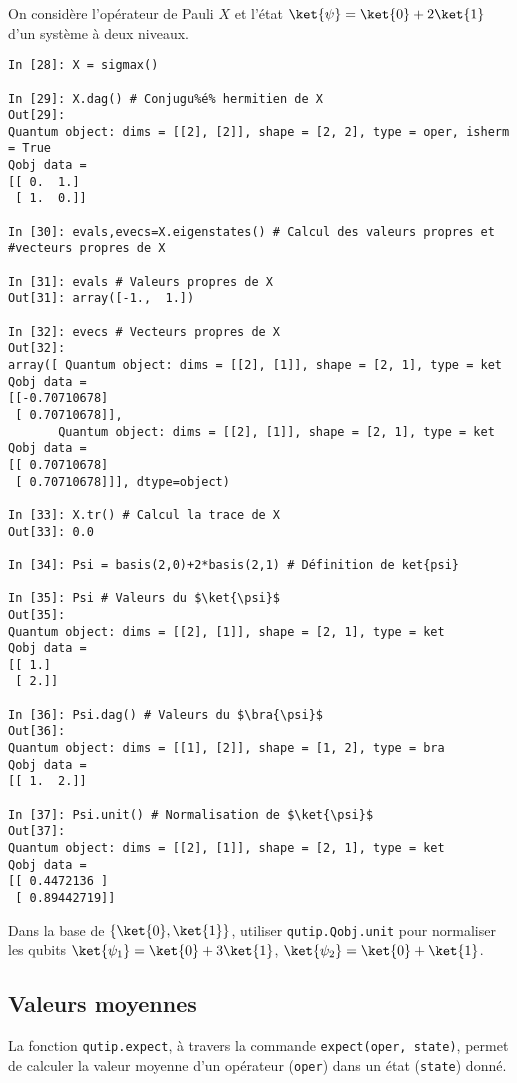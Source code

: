 \begin{example}
On considère l'opérateur de Pauli $X$ et l'état $\ket{\psi}=\ket{0}+2\ket{1}$ 
d'un système à deux niveaux.\\
\begin{lstlisting}
In [28]: X = sigmax()

In [29]: X.dag() # Conjugu%é% hermitien de X
Out[29]: 
Quantum object: dims = [[2], [2]], shape = [2, 2], type = oper, isherm = True
Qobj data =
[[ 0.  1.]
 [ 1.  0.]]

In [30]: evals,evecs=X.eigenstates() # Calcul des valeurs propres et 
#vecteurs propres de X

In [31]: evals # Valeurs propres de X
Out[31]: array([-1.,  1.])

In [32]: evecs # Vecteurs propres de X
Out[32]: 
array([ Quantum object: dims = [[2], [1]], shape = [2, 1], type = ket
Qobj data =
[[-0.70710678]
 [ 0.70710678]],
       Quantum object: dims = [[2], [1]], shape = [2, 1], type = ket
Qobj data =
[[ 0.70710678]
 [ 0.70710678]]], dtype=object)

In [33]: X.tr() # Calcul la trace de X
Out[33]: 0.0

In [34]: Psi = basis(2,0)+2*basis(2,1) # Définition de ket{psi}

In [35]: Psi # Valeurs du $\ket{\psi}$
Out[35]: 
Quantum object: dims = [[2], [1]], shape = [2, 1], type = ket
Qobj data =
[[ 1.]
 [ 2.]]
 
In [36]: Psi.dag() # Valeurs du $\bra{\psi}$
Out[36]: 
Quantum object: dims = [[1], [2]], shape = [1, 2], type = bra
Qobj data =
[[ 1.  2.]]

In [37]: Psi.unit() # Normalisation de $\ket{\psi}$
Out[37]: 
Quantum object: dims = [[2], [1]], shape = [2, 1], type = ket
Qobj data =
[[ 0.4472136 ]
 [ 0.89442719]]
\end{lstlisting}
\end{example}

\begin{exercise}
Dans la base de $\{\ket{0},\ket{1}\}$, utiliser \texttt{qutip.Qobj.unit} pour
normaliser les qubits $\ket{\psi_1}=\ket{0}+3\ket{1}$, 
$\ket{\psi_2}=\ket{0}+\ket{1}$.
\end{exercise}

\subsection{Valeurs moyennes}

La fonction \texttt{qutip.expect}, à travers la commande \texttt{expect(oper, 
state)}, permet de calculer la valeur moyenne d'un opérateur (\texttt{oper}) 
dans un état (\texttt{state}) donné. 

